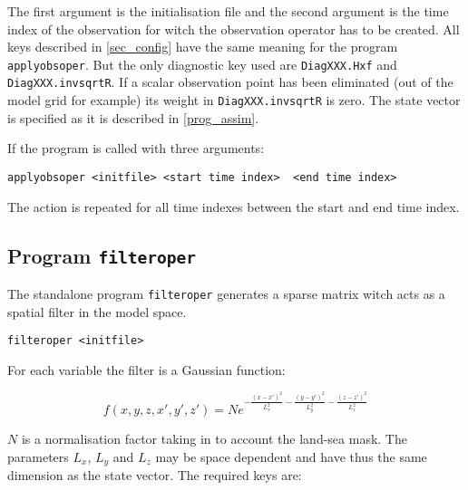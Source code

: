 \documentclass[a4paper,12pt]{article}
\newcommand{\code}{\texttt}
\begin{document}
The first argument is the initialisation file and the second argument is the time index of the observation for witch the observation operator has to be created. All keys described in \ref{sec_config} have the same meaning for the program \code{applyobsoper}. But the only diagnostic key used are \code{DiagXXX.Hxf} and \code{DiagXXX.invsqrtR}. If a scalar observation point has
been eliminated (out of the model grid for example) its weight in \code{DiagXXX.invsqrtR} is zero. The state vector is specified as it is described in \ref{prog_assim}.

If the program is called with three arguments:

\begin{verbatim}
applyobsoper <initfile> <start time index>  <end time index>
\end{verbatim}

The action is repeated for all time indexes between the start and end time index.

\subsection{Program \code{filteroper}}

The standalone program \code{filteroper} generates a sparse matrix witch acts as a spatial filter in the model space. 

\begin{verbatim}
filteroper <initfile>
\end{verbatim}

For each variable the filter is a Gaussian function:

\begin{equation} \label{eqn_filter}
f(x,y,z,x',y',z') = N e^{-\frac{(x-x')^2}{L_x^2}-\frac{(y-y')^2}{L_y^2}-\frac{(z-z')^2}{L_z^2}}
\end{equation}

$N$ is a normalisation factor taking in to account the land-sea mask. The parameters $L_x$, $L_y$ and $L_z$ may be space dependent and have thus the same dimension as the state vector.
The required keys are: \\
\end{document}
